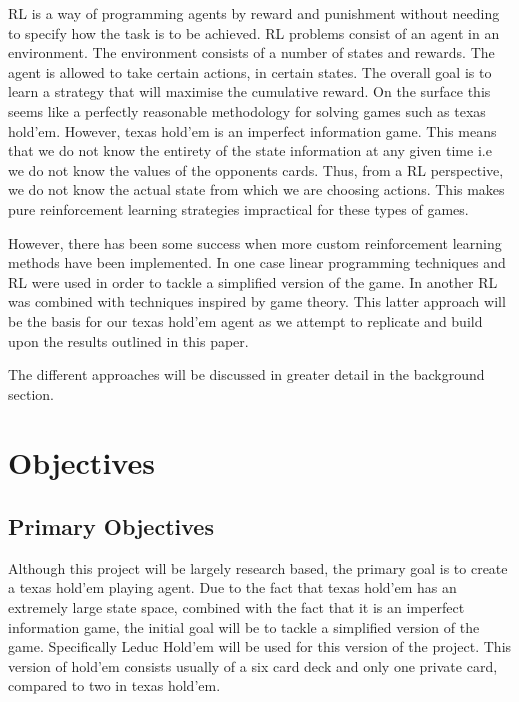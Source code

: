 RL is a way of programming agents by reward and punishment without needing to specify how the
task is to be achieved\citep{kaelbling1996reinforcement}.
RL problems consist of an agent in an environment.
The environment consists of a number of states and rewards.
The agent is allowed to take certain actions, in certain states.
The overall goal is to learn a strategy that will maximise the cumulative reward.
On the surface this seems like a perfectly reasonable methodology for solving games such as texas hold'em.
However, texas hold'em is an imperfect information game.
This means that we do not know the entirety of the state information at any given time
i.e we do not know the values of the opponents cards.
Thus, from a RL perspective, we do not know the actual state from which we are choosing actions.
This makes pure reinforcement learning strategies impractical for these types of games.

However, there has been some success when more custom reinforcement learning methods have been implemented.
In one case linear programming techniques and RL were used in order to tackle a
simplified version of the game\citep{dahl2001reinforcement}.
In another RL was combined with techniques inspired by game theory\citep{heinrich2015fictitious}.
This latter approach will be the basis for our texas hold'em agent as we attempt to replicate and
build upon the results outlined in this paper.

The different approaches will be discussed in greater detail in the background section.

\section{Objectives}\label{sec:objectives}
\subsection{Primary Objectives}\label{subsec:primaryObjectives}

Although this project will be largely research based, the primary goal is to create a texas hold'em
playing agent.
Due to the fact that texas hold'em has an extremely large state space, combined with the fact that it
is an imperfect information game, the initial goal will be to tackle a simplified version of the game.
Specifically Leduc Hold'em will be used for this version of the project.
This version of hold'em consists usually of a six card deck and only one private card, compared to two in texas hold'em.

